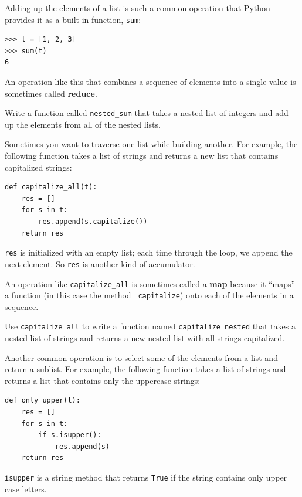 \documentclass[10pt]{book}
\begin{document}
Adding up the elements of a list is such a common operation
that Python provides it as a built-in function, {\tt sum}:

\begin{verbatim}
>>> t = [1, 2, 3]
>>> sum(t)
6
\end{verbatim}
%
An operation like this that combines a sequence of elements into
a single value is sometimes called {\bf reduce}.

\begin{exercise}

Write a function called \verb"nested_sum" that takes a nested list
of integers and add up the elements from all of the nested lists.

\end{exercise}

Sometimes you want to traverse one list while building
another.  For example, the following function takes a list of strings
and returns a new list that contains capitalized strings:

\begin{verbatim}
def capitalize_all(t):
    res = []
    for s in t:
        res.append(s.capitalize())
    return res
\end{verbatim}
%
{\tt res} is initialized with an empty list; each time through
the loop, we append the next element.  So {\tt res} is another
kind of accumulator.

An operation like \verb"capitalize_all" is sometimes called a {\bf
map} because it ``maps'' a function (in this case the method {\tt
capitalize}) onto each of the elements in a sequence.

\begin{exercise}

Use \verb"capitalize_all" to write a function named \verb"capitalize_nested"
that takes a nested list of strings and returns a new nested list
with all strings capitalized.

\end{exercise}

Another common operation is to select some of the elements from
a list and return a sublist.  For example, the following
function takes a list of strings and returns a list that contains
only the uppercase strings:

\begin{verbatim}
def only_upper(t):
    res = []
    for s in t:
        if s.isupper():
            res.append(s)
    return res
\end{verbatim}
%
{\tt isupper} is a string method that returns {\tt True} if
the string contains only upper case letters.
\end{document}
